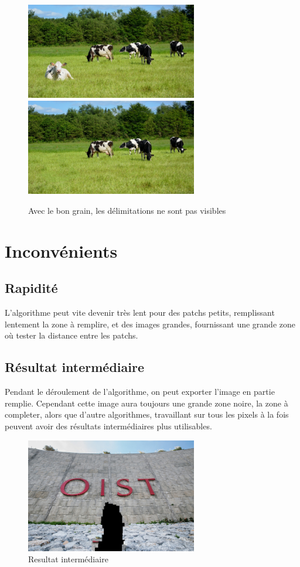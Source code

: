\begin{figure}[ht]
\centering
\includegraphics[width=7.5cm]{img/examples/vache.jpg}
\includegraphics[width=7.5cm]{img/examples/vache_res.jpg}
\caption{Avec le bon grain, les délimitations ne sont pas visibles}
\end{figure}

\section{Inconvénients}
\subsection{Rapidité}
L'algorithme peut vite devenir très lent pour des patchs petits, remplissant lentement
la zone à remplire, et des images grandes, fournissant une grande zone où tester la 
distance entre les patchs.

\subsection{Résultat intermédiaire}
Pendant le déroulement de l'algorithme, on peut exporter l'image en partie remplie.
Cependant cette image aura toujours une grande zone noire, la zone à completer, alors
que d'autre algorithmes, travaillant sur tous les pixels à la fois peuvent avoir des
résultats intermédiaires plus utilisables.

\begin{figure}[ht]
\centering
\includegraphics[width=7.5cm]{img/examples/inter.jpg}
\caption{Resultat intermédiaire}
\end{figure}

